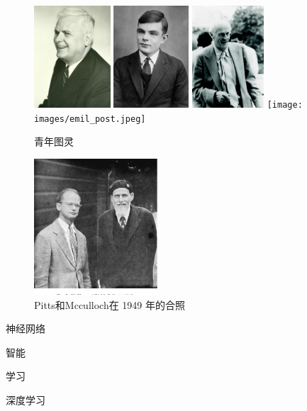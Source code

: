 \documentclass[a4paper,12pt]{article}
\begin{document}
\begin{figure}[ht]
    \centering
    \includegraphics[height=1.5in]{images/alonzo_church.jpg}
    \includegraphics[height=1.5in]{images/alan_turing.jpg}
    \includegraphics[height=1.5in]{images/kleene.jpg}
    \texttt{[image: images/emil\_post.jpeg]}
    \caption{青年图灵}
\end{figure}

\begin{figure}[ht]
    \centering
    \includegraphics[height=2.0in]{images/pitts_mcculloch_1949.png}
    \caption{Pitts和Mcculloch在 1949 年的合照}
\end{figure}

神经网络

智能

学习

深度学习
\end{document}
